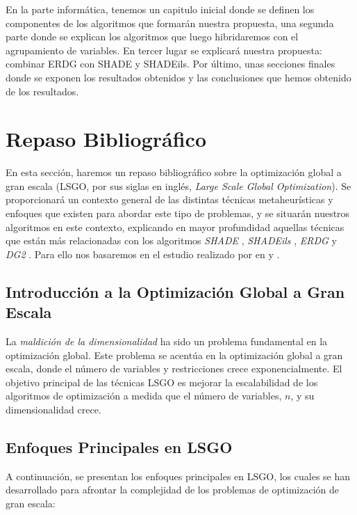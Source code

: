 En la parte informática, tenemos un capitulo inicial donde se definen los componentes de los algoritmos que formarán nuestra propuesta, una segunda parte donde se explican los algoritmos que luego hibridaremos con el agrupamiento de variables. En tercer lugar se explicará nuestra propuesta: combinar ERDG con SHADE y SHADEils. Por último, unas secciones finales donde se exponen los resultados obtenidos y las conclusiones que hemos obtenido de los resultados.

\section*{Repaso Bibliográfico}

En esta sección, haremos un repaso bibliográfico sobre la optimización global a gran escala (LSGO, por sus siglas en inglés, \textit{Large Scale Global Optimization}). Se proporcionará un contexto general de las distintas técnicas metaheurísticas y enfoques que existen para abordar este tipo de problemas, y se situarán nuestros algoritmos en este contexto, explicando en mayor profundidad aquellas técnicas que están más relacionadas con los algoritmos \textit{SHADE} \cite{TanabeShade}, \textit{SHADEils} \citep{Molina2018}, \textit{ERDG} \cite{ERDG} y \textit{DG2} \cite{DG2}. Para ello nos basaremos en el estudio realizado por \citeauthor{Review_I} en \cite{Review_I} y \cite{Review_II}.

\subsection*{Introducción a la Optimización Global a Gran Escala}

La \textit{maldición de la dimensionalidad} \cite{bellman_adaptive_1961} ha sido un problema fundamental en la optimización global. Este problema se acentúa en la optimización global a gran escala, donde el número de variables y restricciones crece exponencialmente. El objetivo principal de las técnicas LSGO es mejorar la escalabilidad de los algoritmos de optimización a medida que el número de variables, \( n \), y su dimensionalidad crece.

\subsection*{Enfoques Principales en LSGO}

A continuación, se presentan los enfoques principales en LSGO, los cuales se han desarrollado para afrontar la complejidad de los problemas de optimización de gran escala:

